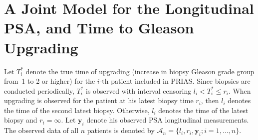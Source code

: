 \section{A Joint Model for the Longitudinal PSA, and Time to Gleason Upgrading}
\label{sec:jm_framework}

Let $T_i^*$ denote the true time of upgrading (increase in biopsy Gleason grade group from~1 to 2 or higher) for the ${i\mbox{-th}}$ patient included in PRIAS. Since biopsies are conducted periodically, $T_i^*$ is observed with interval censoring ${l_i < T_i^* \leq r_i}$. When upgrading is observed for the patient at his latest biopsy time $r_i$, then $l_i$ denotes the time of the second latest biopsy. Otherwise, $l_i$ denotes the time of the latest biopsy and ${r_i=\infty}$. Let $\boldsymbol{y}_{i}$ denote his observed PSA longitudinal measurements. The observed data of all $n$ patients is denoted by ${\mathcal{A}_n = \{l_i, r_i, \boldsymbol{y}_{i}; i = 1, \ldots, n\}}$.

